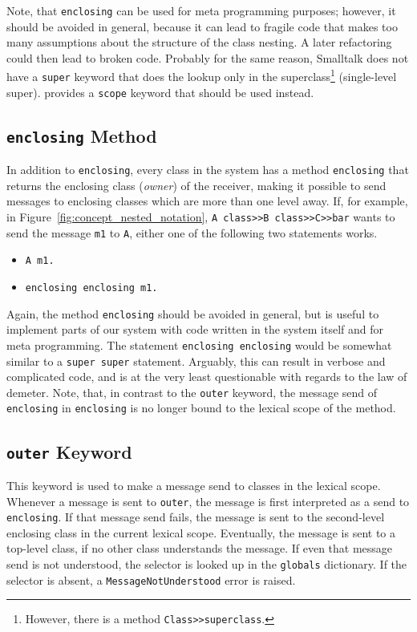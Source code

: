 Note, that \texttt{enclosing} can be used for meta programming purposes; however, it should be avoided in general, because it can lead to fragile code that makes too many assumptions about the structure of the class nesting. A later refactoring could then lead to broken code. Probably for the same reason, Smalltalk does not have a \texttt{super} keyword that does the lookup only in the superclass\footnote{However, there is a method \texttt{Class>>superclass}.} (single-level super). \msname provides a \texttt{scope} keyword that should be used instead.

\subsection{\texttt{enclosing} Method}
In addition to \texttt{enclosing}, every class in the system has a method \texttt{enclosing} that returns the enclosing class (\emph{owner}) of the receiver, making it possible to send messages to enclosing classes which are more than one level away. If, for example, in Figure~\ref{fig:concept_nested_notation}, \texttt{A class>>B class>>C>>bar} wants to send the message \texttt{m1} to \texttt{A}, either one of the following two statements works.

\begin{itemize}
	\item \texttt{A m1.}
	\item \texttt{enclosing enclosing m1.}
\end{itemize}

Again, the method \texttt{enclosing} should be avoided in general, but is useful to implement parts of our system with code written in the system itself and for meta programming. The statement \texttt{enclosing enclosing} would be somewhat similar to a \texttt{super super} statement. Arguably, this can result in verbose and complicated code, and is at the very least questionable with regards to the law of demeter. Note, that, in contrast to the \texttt{outer} keyword, the message send of \texttt{enclosing} in \texttt{enclosing} is no longer bound to the lexical scope of the method.

\subsection{\texttt{outer} Keyword}
\label{sec:concept_outer}
This keyword is used to make a message send to classes in the lexical scope. Whenever a message is sent to \texttt{outer}, the message is first interpreted as a send to \texttt{enclosing}. If that message send fails, the message is sent to the second-level enclosing class in the current lexical scope. Eventually, the message is sent to a top-level class, if no other class understands the message. If even that message send is not understood, the selector is looked up in the \texttt{globals} dictionary. If the selector is absent, a \texttt{MessageNotUnderstood} error is raised.

